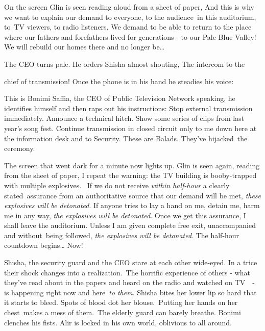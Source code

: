 \documentclass[twoside,11pt]{book}
\begin{document}
On the screen Glin is seen reading aloud from a sheet of paper, {\textquotedbl}And this is why we want to explain our
demand to everyone, to the audience~in this auditorium, to~TV viewers, to radio listeners. We demand to be able to
return to the place where our fathers and forefathers lived for generations - to our Pale Blue Valley! We will rebuild
our homes there and no longer be{\dots}{\textquotedbl}

The CEO turns pale. He orders Shisha almost shouting, {\textquotedbl}The intercom to the 

chief of transmission!{\textquotedbl} Once the phone is in his hand he steadies his voice:

{\textquotedbl}This is Bonimi Saffia, the CEO of Public Television Network speaking,{\textquotedbl} he identifies
himself and then raps out his instructions: {\textquotedbl}Stop external transmission immediately. Announce a technical
hitch. Show some series of clips from last year's song fest. Continue transmission in closed circuit only to me down
here at the information desk and to Security. These are Balads. They've hijacked~the ceremony.{\textquotedbl}~~~~~~ 

The screen that went dark for a minute now lights up. Glin is seen again, reading from the sheet of paper,
{\textquotedbl}I repeat the warning: the TV building is booby-trapped with multiple explosives. \ If we do not receive
\textit{within half-hour} a clearly stated~assurance from an authoritative source that our demand will be met,
\textit{these explosives will be detonated}. If anyone tries to lay a hand on me, detain me, harm me in any way,
\textit{the explosives will be detonated}. Once we get this assurance, I shall leave the auditorium. Unless I am given
complete free exit, unaccompanied and without{\ }being followed, \textit{the
explosives will be detonated}. The half-hour countdown begins{\dots} Now!{\textquotedbl}

Shisha, the security guard and the CEO stare at each other wide-eyed. In a trice their shock changes into a
realization.\ The horrific experience of others -  what they've read about in the papers and heard on the radio and
watched on TV\ \ {}- is happening right now and here\ \textit{to them}. Shisha bites her lower lip so hard that it
starts to bleed. Spots of blood dot her blouse.\ Putting her hands on her chest\ makes a mess of them.\ The elderly
guard can barely breathe. Bonimi clenches his fists. Alir is locked in his own world, oblivious to all around.\ 
\end{document}
